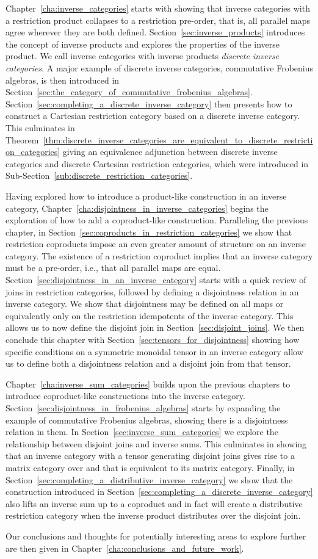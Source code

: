 Chapter~\ref{cha:inverse_categories} starts with showing that inverse categories with a restriction
product collapses to a restriction pre-order, that is, all parallel maps agree wherever they are
both defined. Section~\ref{sec:inverse_products} introduces the concept of inverse products and
explores the properties of the inverse product. We call inverse categories with
inverse products \emph{discrete inverse categories}. A major example of discrete inverse
categories, commutative Frobenius algebras, is then introduced in
Section~\ref{sec:the_category_of_commutative_frobenius_algebras}.
Section~\ref{sec:completing_a_discrete_inverse_category} then presents how to construct a Cartesian
restriction category based on a discrete inverse category. This culminates in
Theorem~\ref{thm:discrete_inverse_categories_are_equivalent_to_discrete_restriction_categories}
giving an equivalence adjunction between discrete inverse categories and discrete Cartesian
restriction categories, which were introduced in Sub-Section~\ref{sub:discrete_restriction_categories}.

Having explored how to introduce a product-like construction in an inverse category,
Chapter~\ref{cha:disjointness_in_inverse_categories} begins the exploration of how to add a
coproduct-like construction. Paralleling the previous chapter, in
Section~\ref{sec:coproducts_in_restriction_categories} we show that restriction coproducts
impose an even greater amount of structure on an inverse category. The existence of a restriction
coproduct implies that an inverse category must be a pre-order, i.e., that all parallel maps are
equal. Section~\ref{sec:disjointness_in_an_inverse_category} starts with a quick review of joins in
restriction categories, followed by defining a disjointness relation in an inverse category. We show
that disjointness may be defined on all maps or equivalently only on the restriction idempotents of
the inverse category. This allows us to now define the disjoint join in
Section~\ref{sec:disjoint_joins}. We then conclude this chapter with
Section~\ref{sec:tensors_for_disjointness} showing how specific conditions on a symmetric monoidal
tensor in an inverse category allow us to define both a disjointness relation and a disjoint join
from that tensor.

Chapter~\ref{cha:inverse_sum_categories} builds upon the previous chapters to introduce
coproduct-like constructions into the inverse
category. Section~\ref{sec:disjointness_in_frobenius_algebras} starts by expanding the example of
commutative Frobenius algebras, showing there is a disjointness relation in them. In
Section~\ref{sec:inverse_sum_categories} we explore the relationship between disjoint joins and
inverse sums. This culminates in showing that an inverse category \X with a tensor generating disjoint
joins gives rise to a matrix category over \X and that \X is equivalent to its matrix
category. Finally, in Section~\ref{sec:completing_a_distributive_inverse_category} we show that the
construction introduced in Section~\ref{sec:completing_a_discrete_inverse_category} also lifts an
inverse sum up to a coproduct and in fact will create a distributive restriction category when the
inverse product distributes over the disjoint join.

Our conclusions and thoughts for potentially interesting areas to explore further are then given in
Chapter~\ref{cha:conclusions_and_future_work}.



